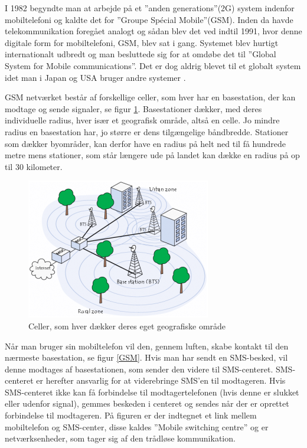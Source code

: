I 1982 begyndte man at arbejde på et ”anden generations”(2G) system indenfor mobiltelefoni og kaldte det for ”Groupe Spécial Mobile”(GSM). Inden da havde telekommunikation foregået analogt og sådan blev det ved indtil 1991, hvor denne digitale form for mobiltelefoni, GSM, blev sat i gang. Systemet blev hurtigt internationalt udbredt og man besluttede sig for at omdøbe det til ”Global System for Mobile communications”. Det er dog aldrig blevet til et globalt system idet man i Japan og USA bruger andre systemer \cite{denstoredanske}.

GSM netværket består af forskellige celler, som hver har en basestation, der kan modtage og sende signaler, se figur \ref{celler}. Basestationer dækker, med deres individuelle radius, hver især et geografisk område, altså en celle. Jo mindre radius en basestation har, jo større er dens tilgængelige båndbredde. Stationer som dækker byområder, kan derfor have en radius på helt ned til få hundrede metre mens stationer, som står længere ude på landet kan dække en radius på op til 30 kilometer.\cite{techviral}

\begin{figure}[H]
\centering
\includegraphics []{Billeder/celler.png}
\caption {Celler, som hver dækker deres eget geografiske område \cite{techviral}}
\label {celler}
\end{figure} 

Når man bruger sin mobiltelefon vil den, gennem luften, skabe kontakt til den nærmeste basestation, se figur \ref{GSM}. Hvis man har sendt en SMS-besked, vil denne modtages af basestationen, som sender den videre til SMS-centeret. SMS-centeret er herefter ansvarlig for at viderebringe SMS’en til modtageren. Hvis SMS-centeret ikke kan få forbindelse til modtagertelefonen (hvis denne er slukket eller udenfor signal), gemmes beskeden i centeret og sendes når der er oprettet forbindelse til modtageren. På figuren er der indtegnet et link mellem mobiltelefon og SMS-center, disse kaldes ”Mobile switching centre” og er netværksenheder, som tager sig af den trådløse kommunikation. \cite{info}

